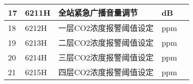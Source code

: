 \begin{longtable}[c]{|l|l|l|l|l|}
	17          & 6211H          & 全站紧急广播音量调节     & dB          &             \\ \hline
	18          & 6212H          & 一层CO2浓度报警阈值设定  & ppm         &             \\ \hline
	19          & 6213H          & 二层CO2浓度报警阈值设定  & ppm         &             \\ \hline
	20          & 6214H          & 三层CO2浓度报警阈值设定  & ppm         &             \\ \hline
	21          & 6215H          & 四层CO2浓度报警阈值设定  & ppm         &             \\ \hline
\end{longtable}